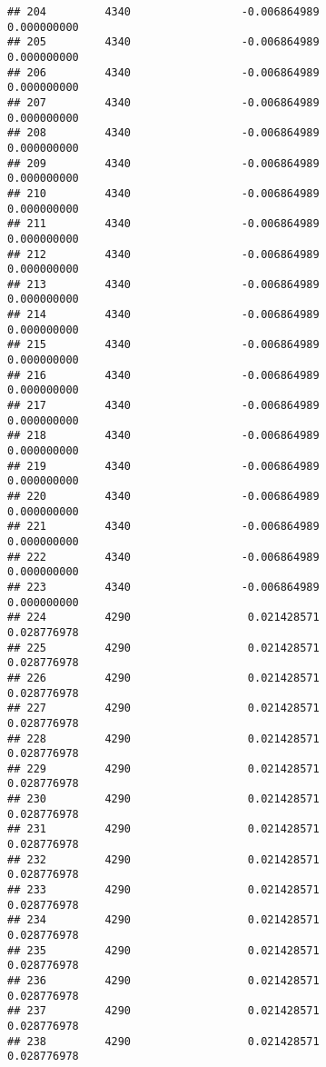 \documentclass[]{article}
\begin{document}
\begin{verbatim}
## 204         4340                 -0.006864989                0.000000000
## 205         4340                 -0.006864989                0.000000000
## 206         4340                 -0.006864989                0.000000000
## 207         4340                 -0.006864989                0.000000000
## 208         4340                 -0.006864989                0.000000000
## 209         4340                 -0.006864989                0.000000000
## 210         4340                 -0.006864989                0.000000000
## 211         4340                 -0.006864989                0.000000000
## 212         4340                 -0.006864989                0.000000000
## 213         4340                 -0.006864989                0.000000000
## 214         4340                 -0.006864989                0.000000000
## 215         4340                 -0.006864989                0.000000000
## 216         4340                 -0.006864989                0.000000000
## 217         4340                 -0.006864989                0.000000000
## 218         4340                 -0.006864989                0.000000000
## 219         4340                 -0.006864989                0.000000000
## 220         4340                 -0.006864989                0.000000000
## 221         4340                 -0.006864989                0.000000000
## 222         4340                 -0.006864989                0.000000000
## 223         4340                 -0.006864989                0.000000000
## 224         4290                  0.021428571                0.028776978
## 225         4290                  0.021428571                0.028776978
## 226         4290                  0.021428571                0.028776978
## 227         4290                  0.021428571                0.028776978
## 228         4290                  0.021428571                0.028776978
## 229         4290                  0.021428571                0.028776978
## 230         4290                  0.021428571                0.028776978
## 231         4290                  0.021428571                0.028776978
## 232         4290                  0.021428571                0.028776978
## 233         4290                  0.021428571                0.028776978
## 234         4290                  0.021428571                0.028776978
## 235         4290                  0.021428571                0.028776978
## 236         4290                  0.021428571                0.028776978
## 237         4290                  0.021428571                0.028776978
## 238         4290                  0.021428571                0.028776978

\end{verbatim}
\end{document}
